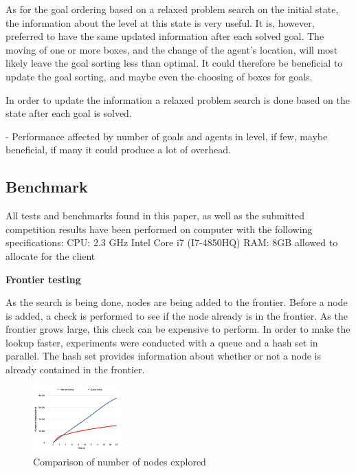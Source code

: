 \documentclass[Main]{subfiles}
\begin{document}
As for the goal ordering based on a relaxed problem search on the initial state, the information about the level at this state is very useful. It is, however, preferred to have the same updated information after each solved goal. The moving of one or more boxes, and the change of the agent's location, will most likely leave the goal sorting less than optimal. It could therefore be beneficial to update the goal sorting, and maybe even the choosing of boxes for goals. 

In order to update the information a relaxed problem search is done based on the state after each goal is solved. 


- Performance affected by number of goals and agents in level, if few, maybe beneficial, if many it could produce a lot of overhead.





\subsection{Benchmark}

All tests and benchmarks found in this paper, as well as the submitted competition results have been performed on computer with the following specifications:
CPU: 2.3 GHz Intel Core i7 (I7-4850HQ) 
RAM: 8GB allowed to allocate for the client


\textbf{Frontier testing}

As the search is being done, nodes are being added to the frontier. Before a node is added, a check is performed to see if the node already is in the frontier. As the frontier grows large, this check can be expensive to perform. In order to make the lookup faster, experiments were conducted with a queue and a hash set in parallel. The hash set provides information about whether or not a node is already contained in the frontier.


\begin{figure}[h!]
    \centering
    \includegraphics[width=0.3\textwidth]{nodes_explored_compare.png}
    \caption{Comparison of number of nodes explored}
    \label{fig:node_explored_comparison}
\end{figure}
\end{document}
